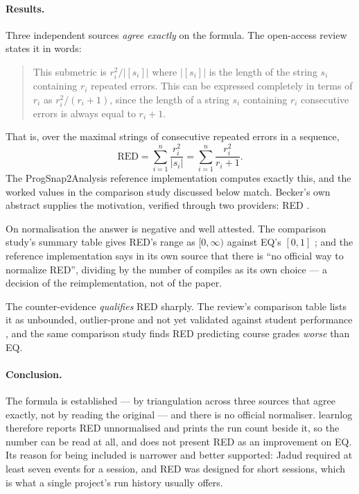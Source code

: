 \paragraph{Results.}
Three independent sources \emph{agree exactly} on the formula.  The
open-access review states it in words:
\blockcquote{villamor2020review}{This submetric is $r_i^2/\lvert[s_i]\rvert$
where $\lvert[s_i]\rvert$ is the length of the string $s_i$ containing $r_i$
repeated errors. This can be expressed completely in terms of $r_i$ as
$r_i^2/(r_i+1)$, since the length of a string $s_i$ containing $r_i$
consecutive errors is always equal to $r_i+1$.}
That is, over the maximal strings of consecutive repeated errors in a
sequence,
\[
  \mathrm{RED} = \sum_{i=1}^{n} \frac{r_i^{2}}{\lvert s_i\rvert}
               = \sum_{i=1}^{n} \frac{r_i^{2}}{r_i + 1}.
\]
The ProgSnap2Analysis reference implementation computes exactly this, and
the worked values in the comparison study discussed below match.  Becker's
own abstract supplies the motivation, verified through two providers: RED
.

On normalisation the answer is negative and well attested.  The comparison
study's summary table gives RED's range as \([0,\infty)\) against EQ's
\([0,1]\) \autocite{svabensky2024comparison}; and the reference
implementation says in its own source that there is
\enquote{no official way to normalize RED}, dividing by the number of
compiles as its own choice --- a decision of the reimplementation, not of
the paper.

The counter-evidence \emph{qualifies} RED sharply.  The review's comparison
table lists it as unbounded, outlier-prone and not yet validated against
student performance \autocite{villamor2020review}, and the same comparison
study finds RED predicting course grades \emph{worse} than EQ.

\paragraph{Conclusion.}
The formula is established --- by triangulation across three sources that
agree exactly, not by reading the original --- and there is no official
normaliser.  learnlog therefore reports RED unnormalised and prints the run
count beside it, so the number can be read at all, and does not present RED
as an improvement on EQ.  Its reason for being included is narrower and
better supported: Jadud required at least seven events for a session, and
RED was designed for short sessions, which is what a single project's run
history usually offers.

